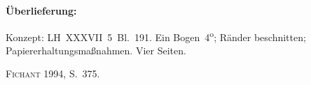 %  
%
%
%
\frenchspacing
%
\begin{ledgroupsized}[r]{120mm}
\footnotesize
\pstart
\noindent\textbf{Überlieferung:}
\pend
\end{ledgroupsized}
%
\begin{ledgroupsized}[r]{114mm}
\footnotesize
\pstart \parindent -6mm
%
Konzept:
LH~XXXVII~5~Bl.~191. 
Ein Bogen~4\textsuperscript{o}; Ränder beschnitten; Papiererhaltungsmaßnahmen.
Vier Seiten.
\pend
\end{ledgroupsized}
%
\begin{ledgroupsized}[r]{114mm}
\footnotesize
\pstart
\parindent -6mm
%
\textsc{Fichant} 1994, S.~375\cite{01056}.
\pend%
\end{ledgroupsized}
%
%
%
\vspace{5mm}
